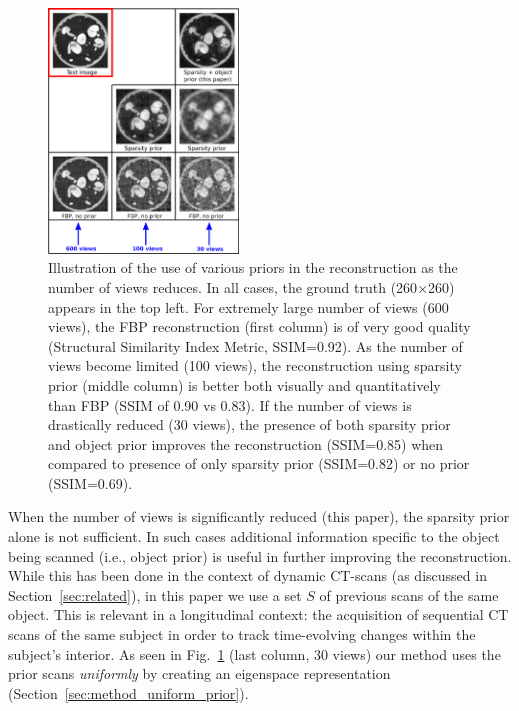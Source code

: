 \documentclass[journal]{IEEEtran}
\begin{document}
 \begin{figure}[t]
\centering
	\includegraphics[width=0.45\textwidth]{../images/story/story.png}
        \caption{Illustration of the use of various priors in the
          reconstruction as the number of views reduces. In all cases,
          the ground truth (260$\times$260) appears in the top left.
          For extremely large number of views (600 views), the FBP
          reconstruction (first column) is of very good quality
          (Structural Similarity Index Metric, SSIM=0.92). As the
          number of views become limited (100 views), the
          reconstruction using sparsity prior (middle column) is
          better both visually and quantitatively than FBP (SSIM of
          0.90 vs 0.83). If the number of views is drastically reduced
          (30 views), the presence of both sparsity prior and object
          prior improves the reconstruction (SSIM=0.85) when compared
          to presence of only sparsity prior (SSIM=0.82) or no prior
          (SSIM=0.69).}
 \label{fig:story}
 \end{figure} 

 When the number of views is significantly reduced (this paper), the
 sparsity prior alone is not sufficient.  In such cases additional
 information specific to the object being scanned (i.e., object prior)
 is useful in further improving the reconstruction.  While this has
 been done in the context of dynamic CT-scans (as discussed in
 Section~\ref{sec:related}), in this paper we use a set $S$ of
 previous scans of the same object. This is relevant in a longitudinal
 context: the acquisition of sequential CT scans of the same subject
 in order to track time-evolving changes within the subject's
 interior. As seen in Fig.~\ref{fig:story} (last column, 30 views) our
 method uses the prior scans \emph{uniformly} by creating an
 eigenspace representation (Section~\ref{sec:method_uniform_prior}).
\end{document}
